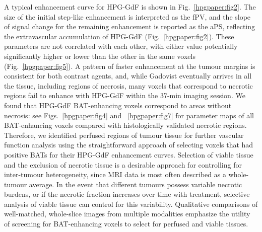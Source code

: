 A typical enhancement curve for HPG-GdF is shown in Fig.~\ref{hpgpaper:fig2}.
The size of the initial step-like enhancement is interpreted as the fPV, and the slope of signal change for the remaining enhancement is reported as the aPS, reflecting the extravascular accumulation of HPG-GdF (Fig.~\ref{hpgpaper:fig2}).
These parameters are not correlated with each other, with either value potentially significantly higher or lower than the other in the same voxels (Fig.~\ref{hpgpaper:fig5}).
A pattern of faster enhancement at the tumour margins is consistent for both contrast agents, and, while Gadovist eventually arrives in all the tissue, including regions of necrosis, many voxels that correspond to necrotic regions fail to enhance with HPG-GdF within the 37-min imaging session.
We found that HPG-GdF BAT-enhancing voxels correspond to areas without necrosis: see Figs.~\ref{hpgpaper:fig4} and ~\ref{hpgpaper:fig7} for parameter maps of all BAT-enhancing voxels compared with histologically validated necrotic regions.
Therefore, we identified perfused regions of tumour tissue for further vascular function analysis using the straightforward approach of selecting voxels that had positive BATs for their HPG-GdF enhancement curves.
Selection of viable tissue and the exclusion of necrotic tissue is a desirable approach for controlling for inter-tumour heterogeneity, since MRI data is most often described as a whole-tumour average.
In the event that different tumours possess variable necrotic burdens, or if the necrotic fraction increases over time with treatment, selective analysis of viable tissue can control for this variability.
Qualitative comparisons of well-matched, whole-slice images from multiple modalities emphasize the utility of screening for BAT-enhancing voxels to select for perfused and viable tissues.


